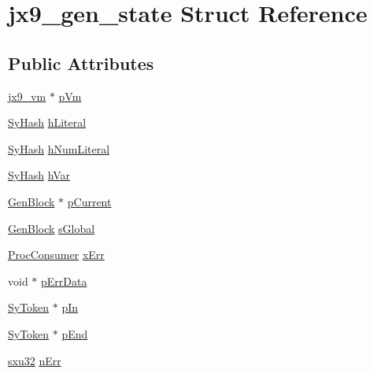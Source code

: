 \hypertarget{structjx9__gen__state}{\section{jx9\-\_\-gen\-\_\-state Struct Reference}
\label{d6/de9/structjx9__gen__state}
}
\subsection*{Public Attributes}
\begin{DoxyCompactItemize}
\item 
\hyperlink{structjx9__vm}{jx9\-\_\-vm} $\ast$ \hyperlink{structjx9__gen__state_ae974863cd6caa1b45e8b45217febccb0}{p\-Vm}
\item 
\hyperlink{struct_sy_hash}{Sy\-Hash} \hyperlink{structjx9__gen__state_a00eb2d68f179b309065fd014b39c6444}{h\-Literal}
\item 
\hyperlink{struct_sy_hash}{Sy\-Hash} \hyperlink{structjx9__gen__state_a80819f0ebff45cb7f87d1f00e1382ab4}{h\-Num\-Literal}
\item 
\hyperlink{struct_sy_hash}{Sy\-Hash} \hyperlink{structjx9__gen__state_a57f26244bf66e6dd24c860575f656f4d}{h\-Var}
\item 
\hyperlink{struct_gen_block}{Gen\-Block} $\ast$ \hyperlink{structjx9__gen__state_aff49ce20b3ff22528336050bd6a6c6c4}{p\-Current}
\item 
\hyperlink{struct_gen_block}{Gen\-Block} \hyperlink{structjx9__gen__state_a3f1886c812a62bd6346e5fad6e29d86f}{s\-Global}
\item 
\hyperlink{unqlite_8h_a23e329c5ae3c9a3233492de42393c93c}{Proc\-Consumer} \hyperlink{structjx9__gen__state_a2f394b42a157573d16ec18014cd2eb46}{x\-Err}
\item 
void $\ast$ \hyperlink{structjx9__gen__state_a994b7d5db62e624eede9eed7e25c797a}{p\-Err\-Data}
\item 
\hyperlink{struct_sy_token}{Sy\-Token} $\ast$ \hyperlink{structjx9__gen__state_a2c7531d27a85e58dcc72f9f5d83adde8}{p\-In}
\item 
\hyperlink{struct_sy_token}{Sy\-Token} $\ast$ \hyperlink{structjx9__gen__state_a85bbe7f5bd90e75646c11c888a7bc261}{p\-End}
\item 
\hyperlink{unqlite_8c_abc5a8a3f345c200c98c485551f49666e}{sxu32} \hyperlink{structjx9__gen__state_acc59df7f005b6057f391af61a2fbef0f}{n\-Err}
\end{DoxyCompactItemize}


